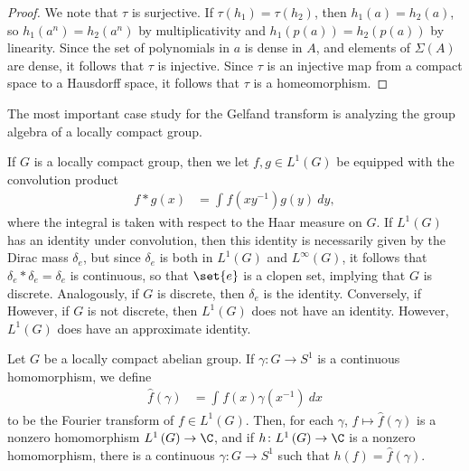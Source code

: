 \documentclass[10pt]{mypackage}
\begin{document}
\begin{proof}
  We note that $\tau$ is surjective. If $\tau\left( h_1 \right)=  \tau\left( h_2 \right)$, then $h_1(a) = h_2(a)$, so $h_1\left(a^{n}\right) = h_2\left( a^n \right)$ by multiplicativity and $h_1\left( p(a) \right) = h_2\left( p(a) \right)$ by linearity. Since the set of polynomials in $a$ is dense in $A$, and elements of $\Sigma(A)$ are dense, it follows that $\tau$ is injective. Since $\tau$ is an injective map from a compact space to a Hausdorff space, it follows that $\tau$ is a homeomorphism.
\end{proof}
The most important case study for the Gelfand transform is analyzing the group algebra of a locally compact group.

If $G$ is a locally compact group, then we let $f,g\in L^1\left( G \right)$ be equipped with the convolution product
\begin{align*}
  f\ast g(x) &= \int_{}^{} f\left( xy^{-1} \right)g(y)\:dy,
\end{align*}
where the integral is taken with respect to the Haar measure on $G$. If $L^1(G)$ has an identity under convolution, then this identity is necessarily given by the Dirac mass $\delta_e$, but since $\delta_e$ is both in $L^1(G)$ and $L^{\infty}(G)$, it follows that $\delta_e\ast \delta_e = \delta_e$ is continuous, so that $\set{e}$ is a clopen set, implying that $G$ is discrete. Analogously, if $G$ is discrete, then $\delta_e$ is the identity. Conversely, if  However, if $G$ is not discrete, then $L^1(G)$ does not have an identity. However, $L^1(G)$ does have an approximate identity.
\begin{theorem}
  Let $G$ be a locally compact abelian group. If $\gamma\colon G\to S^1$ is a continuous homomorphism, we define
  \begin{align*}
    \hat{f}\left( \gamma \right) &= \int_{}^{} f(x)\gamma\left( x^{-1} \right)\:dx
  \end{align*}
  to be the Fourier transform of $f\in L^1\left( G \right)$. Then, for each $\gamma$, $f\mapsto \hat{f}(\gamma)$ is a nonzero homomorphism $L^1\left( G \right)\to \C$, and if $h\colon L^1\left( G \right)\to \C$ is a nonzero homomorphism, there is a continuous $\gamma\colon G\to S^1$ such that $h(f) = \hat{f}(\gamma)$.
\end{theorem}
\end{document}
